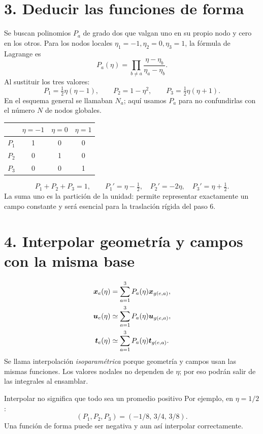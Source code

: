 \documentclass[11pt]{article}
\begin{document}
\newpage
\section*{3. Deducir las funciones de forma}
Se buscan polinomios \(P_a\) de grado dos que valgan uno en su propio nodo y
cero en los otros. Para los nodos locales \(\eta_1=-1,\eta_2=0,\eta_3=1\),
la fórmula de Lagrange es
\[
 P_a(\eta)=\prod_{b\ne a}\frac{\eta-\eta_b}{\eta_a-\eta_b}.
\]
Al sustituir los tres valores:
\[
 \boxed{P_1=\tfrac12\eta(\eta-1),\qquad
 P_2=1-\eta^2,\qquad P_3=\tfrac12\eta(\eta+1).}
\]
En el esquema general se llamaban \(N_a\); aquí usamos \(P_a\) para no
confundirlas con el número \(N\) de nodos globales.

\begin{center}
\begin{tabular}{c|ccc}
\toprule
 & \(\eta=-1\)&\(\eta=0\)&\(\eta=1\)\\
\midrule
\(P_1\)&1&0&0\\
\(P_2\)&0&1&0\\
\(P_3\)&0&0&1\\
\bottomrule
\end{tabular}
\end{center}
\[
 P_1+P_2+P_3=1,\qquad
 P_1'=\eta-\tfrac12,\quad P_2'=-2\eta,\quad
 P_3'=\eta+\tfrac12.
\]
La suma uno es la partición de la unidad: permite representar exactamente
un campo constante y será esencial para la traslación rígida del paso 6.

\section*{4. Interpolar geometría y campos con la misma base}
\[
\begin{aligned}
 \bm{x}_e(\eta)&=\sum_{a=1}^3P_a(\eta)\bm{x}_{g(e,a)},\\
 \bm{u}_e(\eta)&\simeq\sum_{a=1}^3P_a(\eta)\bm{u}_{g(e,a)},\\
 \bm{t}_e(\eta)&\simeq\sum_{a=1}^3P_a(\eta)\bm{t}_{g(e,a)}.
\end{aligned}
\]
Se llama interpolación \emph{isoparamétrica} porque geometría y campos usan
las mismas funciones. Los valores nodales no dependen de \(\eta\);
por eso podrán salir de las integrales al ensamblar.

\begin{alerta}{Interpolar no significa que todo sea un promedio positivo}
Por ejemplo, en \(\eta=1/2\):
\[
 (P_1,P_2,P_3)=(-1/8,\,3/4,\,3/8).
\]
Una función de forma puede ser negativa y aun así interpolar correctamente.
\end{alerta}
\end{document}
